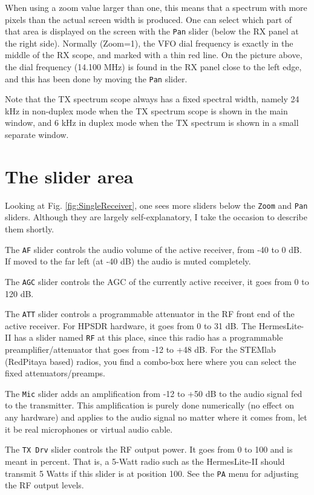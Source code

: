 \documentclass[12pt]{book}
\def\rett#1{\texttt{\color{red}#1}}
\def\bltt#1{\texttt{\color{blue}#1}}
\begin{document}
When using a zoom value larger than one, this means that
a spectrum with more pixels than the actual screen width
is produced. One can select which part of that area
is displayed on the screen with the \rett{Pan} slider
(below the RX panel at the right side). Normally (Zoom=1),
the VFO dial frequency is exactly in the middle of the
RX scope, and marked with a thin red line. On the picture
above, the dial frequency (14.100 MHz) is found in the RX
panel close to the left edge, and this has been done
by moving the \rett{Pan} slider.

Note that the TX spectrum scope always has a fixed spectral
width, namely 24 kHz in non-duplex mode when the TX spectrum
scope is shown in the main window, and 6 kHz in duplex mode
when the TX spectrum is shown in a small separate window.

\section{The slider area}
\label{sec:SliderArea}
Looking at Fig. \ref{fig:SingleReceiver}, one sees more sliders below the \rett{Zoom} and \rett{Pan}
sliders. Although they are largely self-explanatory, I take the occasion to describe them shortly.

The \rett{AF} slider controls the audio volume of the active receiver, from -40 to 0 dB. If moved to the
far left (at -40 dB) the audio is muted completely.

The \rett{AGC} slider controls the AGC of the currently active receiver, it goes from 0 to 120 dB.

The \rett{ATT} slider controls a programmable attenuator in the RF front end of the active receiver. For
HPSDR hardware, it goes from 0 to 31 dB. The HermesLite-II has a slider named \rett{RF} at this place,
since this radio has a programmable preamplifier/attenuator that goes from -12 to +48 dB. For the STEMlab
(RedPitaya based) radios, you find a combo-box here where you can select the fixed attenuators/preamps.

The \rett{Mic} slider adds an amplification from -12 to +50 dB to the audio signal fed to the transmitter.
This amplification is purely done numerically (no effect on any hardware) and applies to the audio signal
no matter where it comes from, let it be real microphones or virtual audio cable.

The \rett{TX Drv} slider controls the RF output power. It goes from 0 to 100 and is meant in percent. That is,
a 5-Watt radio such as the HermesLite-II should transmit 5 Watts if this slider is at position 100. See the
\bltt{PA} menu for adjusting the RF output levels.
\end{document}

